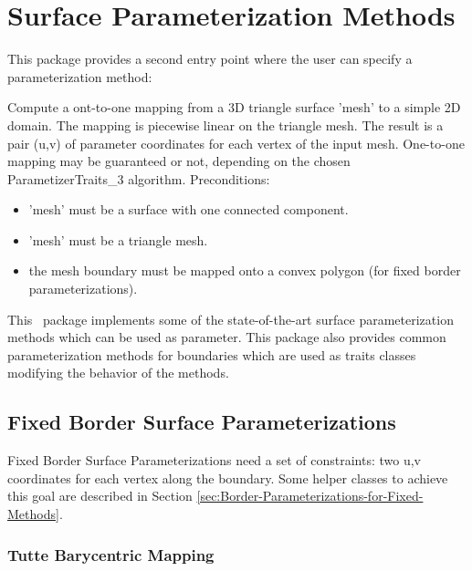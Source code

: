 \section{Surface Parameterization Methods}


This package provides a second  entry point
where the user can specify a parameterization method:

{ Compute a ont-to-one mapping from a 3D triangle surface 'mesh' to a
simple 2D domain. The mapping is piecewise linear on the triangle
mesh. The result is a pair (u,v) of parameter coordinates for each
vertex of the input mesh.  One-to-one mapping may be guaranteed or
not, depending on the chosen ParametizerTraits\_3 algorithm.
Preconditions:\begin{itemize}
\item 'mesh' must be a surface with one connected component.\item
'mesh' must be a triangle mesh.\item the mesh boundary must be mapped
onto a convex polygon (for fixed border
parameterizations).\end{itemize} }


This \cgal\ package implements some of the state-of-the-art surface
parameterization methods which can be used as
 parameter. This package also provides common parameterization methods for
boundaries which are used as traits classes modifying the behavior of
the  methods.


\subsection{Fixed Border Surface Parameterizations}


Fixed Border Surface Parameterizations need a set of constraints: two
u,v coordinates for each vertex along the boundary. Some helper
classes to achieve this goal are described in Section
\ref{sec:Border-Parameterizations-for-Fixed-Methods}.

\subsubsection{Tutte Barycentric Mapping}

